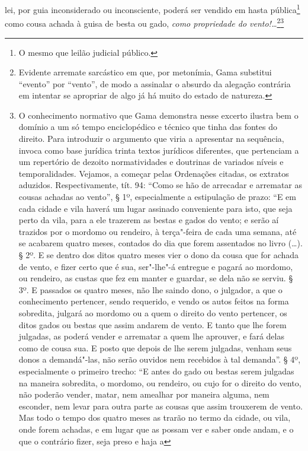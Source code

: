 lei, por guia inconsiderado ou inconsciente, poderá ser vendido em hasta
pública\footnote{O mesmo que leilão judicial público.} como cousa
achada à guisa de besta ou gado, \emph{como propriedade do
vento!\ldots{}}\footnote{Evidente arremate sarcástico em que, por
  metonímia, Gama substitui ``evento'' por ``vento'', de modo a assinalar o
  absurdo da alegação contrária em intentar se apropriar de algo já há
  muito do estado de natureza.}\footnote{O conhecimento normativo que
  Gama demonstra nesse excerto ilustra bem o domínio a um só tempo
  enciclopédico e técnico que tinha das fontes do direito. Para
  introduzir o argumento que viria a apresentar na sequência, invoca
  como base jurídica trinta textos jurídicos diferentes, que pertenciam
  a um repertório de dezoito normatividades e doutrinas de variados
  níveis e temporalidades. Vejamos, a começar pelas Ordenações citadas,
  os extratos aduzidos. Respectivamente, tít. 94: ``Como se hão de
  arrecadar e arrematar as cousas achadas ao vento'', § 1º,
  especialmente a estipulação de prazo: ``E em cada cidade e vila
  haverá um lugar assinado conveniente para isto, que seja perto da
  vila, para a ele trazerem as bestas e gados do vento; e serão aí
  trazidos por o mordomo ou rendeiro, à terça"-feira de cada uma semana,
  até se acabarem quatro meses, contados do dia que forem assentados no
  livro (\ldots{}). § 2º. E se dentro dos ditos quatro meses vier o dono da
  cousa que for achada de vento, e fizer certo que é sua, ser"-lhe"-á
  entregue e pagará ao mordomo, ou rendeiro, as custas que fez em manter
  e guardar, se dela não se serviu. § 3º. E passados os quatro meses,
  não lhe saindo dono, o julgador, a que o conhecimento pertencer, sendo
  requerido, e vendo os autos feitos na forma sobredita, julgará ao
  mordomo ou a quem o direito do vento pertencer, os ditos gados ou
  bestas que assim andarem de vento. E tanto que lhe forem julgadas, as
  poderá vender e arrematar a quem lhe aprouver, e fará delas como de
  cousa sua. E posto que depois de lhe serem julgadas, venham seus donos
  a demandá"-las, não serão ouvidos nem recebidos à tal demanda''. § 4º,
  especialmente o primeiro trecho: ``E antes do gado ou bestas serem
  julgadas na maneira sobredita, o mordomo, ou rendeiro, ou cujo for o
  direito do vento, não poderão vender, matar, nem amealhar por maneira
  alguma, nem esconder, nem levar para outra parte as cousas que assim
  trouxerem de vento. Mas todo o tempo dos quatro meses as trarão no
  termo da cidade, ou vila, onde forem achadas, e em lugar que as possam
  ver e saber onde andam, e o que o contrário fizer, seja preso e haja a
}
